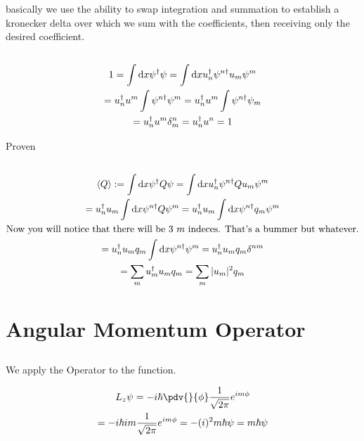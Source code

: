 \documentclass[]{scrartcl}
\begin{document}
basically we use the ability to swap integration and summation to establish a kronecker delta over which we sum with the coefficients, then receiving only the desired coefficient.

\subsection{}

\begin{gather}
	1 = \int \text dx \psi^\dagger \psi = \int \text dx u_n^\dagger \psi^{n\dagger} u_m \psi^m\\
	= u_n^\dagger u^m \int \psi^{n\dagger}\psi^m = u_n^\dagger u^m \int \psi^{n\dagger} \psi_m\\
	= u_n^\dagger u^m \delta^n_m = u_n^\dagger u^n = 1
\end{gather}

Proven

\subsection{}

\begin{gather}
\langle Q \rangle := \int \text dx \psi^\dagger Q\psi = \int \text dx u_n^\dagger\psi^{n\dagger} Q u_m \psi^m\\
= u_n^\dagger u_m \int \text dx \psi^{n\dagger}Q\psi^m = u_n^\dagger u_m \int \text dx \psi^{n\dagger}q_m \psi^m\\
\text{Now you will notice that there will be 3 $m$ indeces. That's a bummer but whatever.}\nonumber\\
= u_n^\dagger u_m q_m \int \text dx \psi^{n\dagger}\psi^m = u_n^\dagger u_m q_m \delta^{nm}\\
= \sum_m u_m^\dagger u_m q_m = \sum_m |u_m|^2 q_m
\end{gather}

\section{Angular Momentum Operator}

\subsection{}

We apply the Operator to the function.

\begin{gather}
	L_z \psi = -i\hbar \pdv{}{\phi}\frac{1}{\sqrt{2\pi}}e^{im\phi}\\
	= -i\hbar im \frac{1}{\sqrt{2\pi}}e^{im\phi} = -(i)^2m\hbar \psi = m\hbar\psi
\end{gather}
\end{document}
